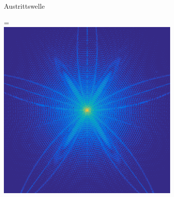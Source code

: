 \begin{figure}[b]
\begin{subfigure}[b]{0.45\textwidth}
		\caption{Austrittswelle}
		\label{fig:komplexexit}
	\end{subfigure}	\hfill
	\begin{subfigure}[b]{0.45\textwidth}
		=\hbox{\includegraphics[width=\textwidth]{images/fig_simholo_v2_scatter.png}}

\end{subfigure}
\end{figure}
